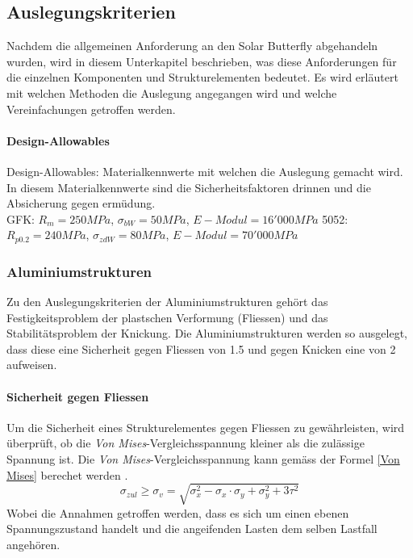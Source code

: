 \subsection{Auslegungskriterien}
Nachdem die allgemeinen Anforderung an den Solar Butterfly abgehandeln wurden, wird in diesem Unterkapitel beschrieben, was diese Anforderungen für die einzelnen Komponenten und Strukturelementen bedeutet. Es wird erläutert mit welchen Methoden die Auslegung angegangen wird und welche Vereinfachungen getroffen werden.\\

\paragraph{Design-Allowables}
Design-Allowables: Materialkennwerte mit welchen die Auslegung gemacht wird.\\
In diesem Materialkennwerte sind die Sicherheitsfaktoren drinnen und die Absicherung gegen ermüdung.\\

GFK: $R_m = 250 MPa$, $\sigma_{bW} = 50 MPa$, $E-Modul = 16'000 MPa$
5052: $R_{p0.2} = 240 MPa$, $\sigma_{zdW} = 80 MPa$, $E-Modul = 70'000 MPa$

  \subsubsection{Aluminiumstrukturen}
  Zu den Auslegungskriterien der Aluminiumstrukturen gehört das Festigkeitsproblem der plastschen Verformung (Fliessen) und das Stabilitätsproblem der Knickung. Die Aluminiumstrukturen werden so ausgelegt, dass diese eine Sicherheit gegen Fliessen von 1.5 und gegen Knicken eine von 2 aufweisen.

  \paragraph{Sicherheit gegen Fliessen}
  Um die Sicherheit eines Strukturelementes gegen Fliessen zu gewährleisten, wird überprüft, ob die \emph{Von Mises}-Vergleichsspannung kleiner als die zulässige Spannung ist. Die \emph{Von Mises}-Vergleichsspannung kann gemäss der Formel \ref{Von Mises} berechet werden \cite{Baertsch}.
  \begin{equation}
    \label{Von Mises}
    \sigma_{zul} \geq \sigma_v = \sqrt{\sigma_x^{2}-\sigma_x \cdot \sigma_y + \sigma_y^2 + 3\tau^2}
  \end{equation}
  Wobei die Annahmen getroffen werden, dass es sich um einen ebenen Spannungszustand handelt und die angeifenden Lasten dem selben Lastfall angehören.

